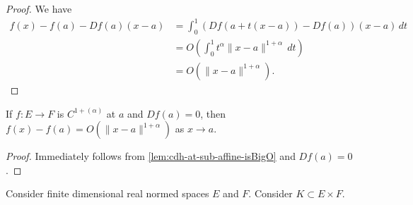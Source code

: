 \begin{proof}
  We have
  \begin{align*}
    f(x) - f(a) - Df(a)(x - a) &= \int_{0}^{1}\left(Df(a + t(x - a)) - Df(a)\right)(x - a)\,dt\\
                               &= O\left(\int_{0}^{1}t^{\alpha}\|x - a\|^{1+\alpha}\,dt\right)\\
                               &= O\left(\|x - a\|^{1 + \alpha}\right).
  \end{align*}
\end{proof}

\begin{corollary}%
  \label{cor:cdh-at-sub-isBigO}
  If \(f\colon E \to F\) is \(C^{1+(\alpha)}\) at \(a\) and \(Df(a) = 0\),
  then \(f(x) - f(a) = O\left(\|x - a\|^{1 + \alpha}\right)\) as \(x \to a\).
\end{corollary}

\begin{proof}
  Immediately follows from \autoref{lem:cdh-at-sub-affine-isBigO} and \(Df(a) = 0\).
\end{proof}


\begin{lemma}%
  \label{lem:chart-one-deriv-zero-bdd}
  Consider finite dimensional real normed spaces \(E\) and \(F\).
  Consider \(K \subset E \times F\).
\end{lemma}


